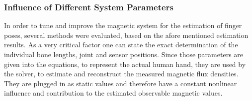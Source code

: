 
\FloatBarrier	
\subsubsection{Influence of Different System Parameters}

In order to tune and improve the magnetic system for the estimation of finger poses, several methods were evaluated, based on the afore mentioned estimation results. As a very critical factor one can state the exact determination of the individual bone lengths, joint and sensor positions. Since those parameters are given into the equations, to represent the actual human hand, they are used by the solver, to estimate and reconstruct the measured magnetic flux densities. They are plugged in as static values and therefore have a constant nonlinear influence and contribution to the estimated observable magnetic values. 

